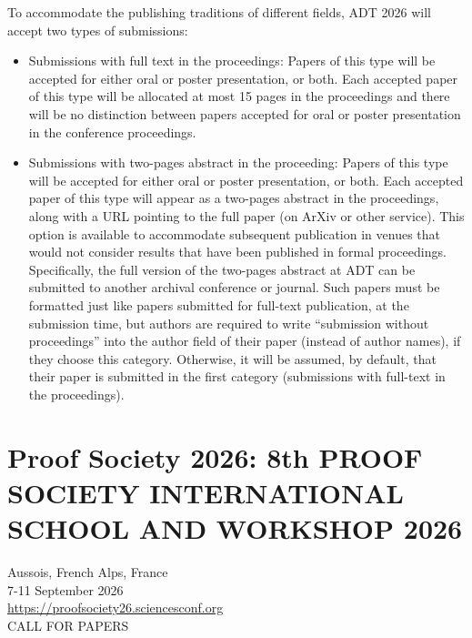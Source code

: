 \documentclass[prodmode,acmtecs]{acmsmall} %
\begin{document}
\begin{itemize}
  To accommodate the publishing traditions of different fields, ADT 2026 will accept two types of submissions:  
 
\begin{itemize}\item  Submissions with full text in the proceedings: Papers of this type will be accepted for either oral or poster presentation, or both. Each accepted paper of this type will be allocated at most 15 pages in the proceedings and there will be no distinction between papers accepted for oral or poster presentation in the conference proceedings. 
\item  Submissions with two-pages abstract in the proceeding: Papers of this type will be accepted for either oral or poster presentation, or both. Each accepted paper of this type will appear as a two-pages abstract in the proceedings, along with a URL pointing to the full paper (on ArXiv or other service). This option is available to accommodate subsequent publication in venues that would not consider results that have been published in formal proceedings. Specifically, the full version of the two-pages abstract at ADT can be submitted to another archival conference or journal. Such papers must be formatted just like papers submitted for full-text publication, at the submission time, but authors are required to write “submission without proceedings” into the author field of their paper (instead of author names), if they choose this category. Otherwise, it will be assumed, by default, that their paper is submitted in the first category (submissions with full-text in the proceedings).  
\end{itemize} 
\end{itemize}\section{Proof Society 2026: 8th PROOF SOCIETY INTERNATIONAL SCHOOL AND WORKSHOP 2026}\label{ProofSociety2026}  Aussois, French Alps, France\\ 
  7-11 September 2026\\ 
  \href{https://proofsociety26.sciencesconf.org}{https://proofsociety26.sciencesconf.org}\\ 
CALL FOR PAPERS 
\end{document}
